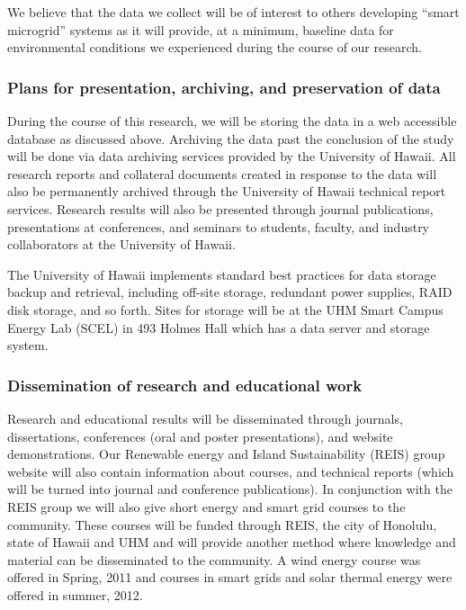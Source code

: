 We believe that the data we collect will be of interest to others developing ``smart microgrid'' systems as it will provide, at a minimum, baseline data for environmental conditions we experienced during the course of our research.

\subsubsection*{Plans for presentation, archiving, and preservation of data}

During the course of this research, we will be storing the data in a web accessible database as discussed above. Archiving the data past the conclusion of the study will be done via data archiving services provided by the University of Hawaii. All research reports and collateral documents created in response to the data will also be permanently archived through the University of Hawaii technical report services.   Research results will also be presented through journal publications, presentations at conferences, and seminars to students, faculty, and industry collaborators at the University of Hawaii.

The University of Hawaii implements standard best practices for data storage backup and retrieval, including off-site storage, redundant power supplies, RAID disk storage, and so forth.  Sites for storage will be at the UHM Smart Campus Energy Lab (SCEL)  in 493 Holmes Hall which has a data server and storage system.

\subsubsection*{Dissemination of research and educational work}

Research and educational results will be disseminated through journals, dissertations, conferences (oral and poster presentations), and website demonstrations.   Our Renewable energy and Island Sustainability  (REIS) group website will also contain information about courses, and technical reports (which will be turned into journal and conference publications).  In conjunction with the REIS group we will also give short energy and smart grid courses to the community.  These courses will be funded through REIS, the city of Honolulu, state of Hawaii and UHM and will provide another method where knowledge and material can be disseminated to the community.  A wind energy course was offered in Spring, 2011 and courses in smart grids and solar thermal energy were offered in summer, 2012.  




